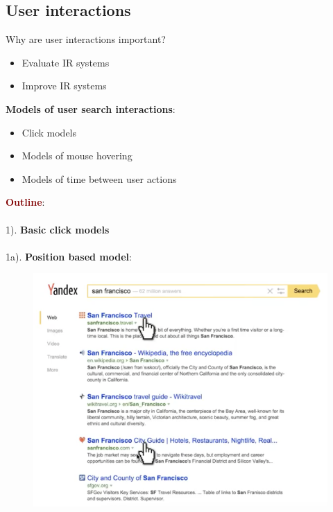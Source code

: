 \newpage

\subsection{User interactions}
\begin{minipage}{0.5\textwidth}
Why are user interactions important?
\begin{itemize}
    \item Evaluate IR systems
    \item Improve IR systems \\
\end{itemize}
\end{minipage}
\begin{minipage}{0.5\textwidth}
\textbf{Models of user search interactions}: 
\begin{itemize}
    \setlength\itemsep{0em}
    \item Click models
    \item Models of mouse hovering
    \item Models of time between user actions
\end{itemize}
\end{minipage}



\vspace{0.5cm}

{\Huge \textbf{\textcolor{Maroon}{Outline}}}: \\
\\
{\huge 1). \textbf{Basic click models} } \\
\\
{\Large 1a). \textbf{Position based model}: }

\begin{figure}[ht!]
    \includegraphics[scale=0.6]{figures/positionbased.png}
\end{figure}

